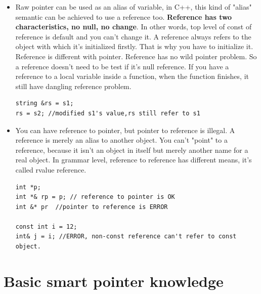 \documentclass[a4paper,11pt,twoside]{book}
\begin{document}
\begin{itemize}
	\item Raw pointer can be used as an alias of variable, in C++, this kind of "alias" semantic can be achieved to use a reference too.  \textbf{Reference has two characteristics, no null, no change}. In other words, top level of const of reference is default and you can't change it. A reference always refers to the object with which it's initialized firstly. That is why you have to initialize it. Reference is different with pointer. Reference has no wild pointer problem. So a reference doesn't need to be test if it's null reference. If you have a reference to a local variable inside a function, when the function finishes, it still have dangling reference problem. 
\begin{lstlisting}[numbers = none]
string &rs = s1;
rs = s2; //modified s1's value,rs still refer to s1
\end{lstlisting}	
	
\item You can have reference to pointer, but pointer to reference is illegal. A reference is merely an alias to another object. You can't "point" to a reference, because it isn't an object in itself but merely another name for a real object. In grammar level, reference to reference has different means, it's called rvalue reference. 
\begin{lstlisting}[numbers=none]
int *p;
int *& rp = p; // reference to pointer is OK
int &* pr  //pointer to reference is ERROR

const int i = 12;
int& j = i; //ERROR, non-const reference can't refer to const object.
\end{lstlisting}	
	
\end{itemize}


\section{Basic smart pointer knowledge}
\end{document}
